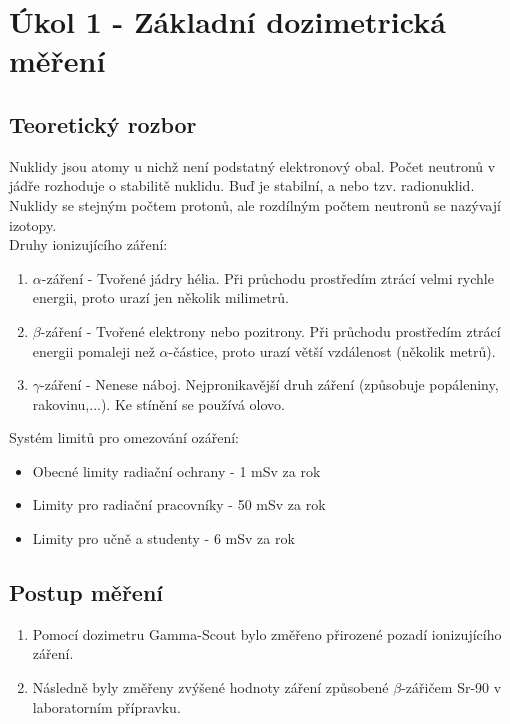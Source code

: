 \documentclass{protokol}
\begin{document}
\pagebreak 

\section{Úkol 1 - Základní dozimetrická měření}
    \subsection{Teoretický rozbor}
    Nuklidy jsou atomy u nichž není podstatný elektronový obal. Počet neutronů v jádře rozhoduje o stabilitě nuklidu. Buď je stabilní, a nebo tzv. radionuklid. Nuklidy se stejným počtem protonů, ale
    rozdílným počtem neutronů se nazývají izotopy.\\Druhy ionizujícího záření:
    \begin{enumerate}
        \item $\alpha$-záření - Tvořené jádry hélia. Při průchodu prostředím ztrácí velmi rychle energii, proto urazí jen několik milimetrů.
        \item $\beta$-záření - Tvořené elektrony nebo pozitrony. Při průchodu prostředím ztrácí energii pomaleji než $\alpha$-částice, proto urazí větší vzdálenost (několik metrů).
        \item $\gamma$-záření - Nenese náboj. Nejpronikavější druh záření (způsobuje popáleniny, rakovinu,...). Ke stínění se používá olovo.
    \end{enumerate}
    Systém limitů pro omezování ozáření:
    \begin{itemize}
        \item Obecné limity radiační ochrany - 1 mSv za rok
        \item Limity pro radiační pracovníky - 50 mSv za rok
        \item Limity pro učně a studenty - 6 mSv za rok
    \end{itemize}

    \subsection{Postup měření}
    \begin{enumerate}
        \item Pomocí dozimetru Gamma-Scout bylo změřeno přirozené pozadí ionizujícího záření.
        \item Následně byly změřeny zvýšené hodnoty záření způsobené $\beta$-zářičem Sr-90 v laboratorním přípravku.
    \end{enumerate}
\end{document}
